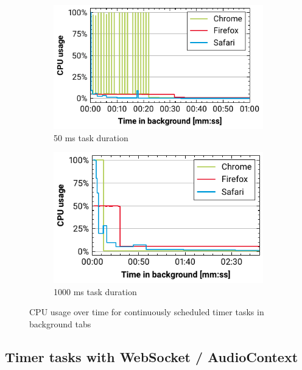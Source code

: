 \documentclass[
	ruledheaders=section,%
	class=report,%
	thesis={type=bachelor},%
	accentcolor=9c,%
	custommargins=true,%
	marginpar=false,%
	parskip=half-,%
	fontsize=11pt,%
]{tudapub}
\begin{document}
  
  \begin{figure}
    \begin{subfigure}[t]{0.5\textwidth}
      \includegraphics[width=\textwidth]{images/timer-50.pdf}
      \caption{50 ms task duration}
    \end{subfigure}
    \hfill
    \begin{subfigure}[t]{0.5\textwidth}
      \includegraphics[width=\textwidth]{images/timer-1000.pdf}
      \caption{1000 ms task duration}
    \end{subfigure}

    \caption{CPU usage over time for continuously scheduled timer tasks in background tabs}
    \label{fig:timer}
  \end{figure}

  \subsection{Timer tasks with WebSocket / AudioContext}
\end{document}
